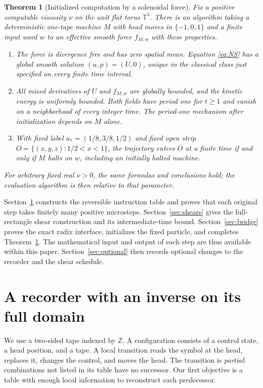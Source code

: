 \documentclass[11pt]{article}
\newtheorem{theorem}{Theorem}[section]
\theoremstyle{remark}
\newcommand{\T}{\mathbb T}
\begin{document}
\begin{theorem}[Initialized computation by a solenoidal force]\label{thm:initialized}
Fix a positive computable viscosity $\nu$ on the unit flat torus $\T^3$.
There is an algorithm taking a deterministic one-tape machine $M$ with head
moves in $\{-1,0,1\}$ and a finite input word $w$ to an effective smooth force
$f_{M,w}$ with these properties.
\begin{enumerate}[label=(\roman*),itemsep=2pt]
\item The force is divergence free and has zero spatial mean. Equation
\eqref{eq:NS} has a global smooth solution $(u,p)=(U,0)$, unique in the
classical class just specified on every finite time interval.
\item All mixed derivatives of $U$ and $f_{M,w}$ are globally bounded, and
the kinetic energy is uniformly bounded. Both fields have period one for
$t\ge1$ and vanish on a neighborhood of every integer time. The period-one
mechanism after initialization depends on $M$ alone.
\item With fixed label $a_*=(1/8,3/8,1/2)$ and fixed open strip
$O=\{(x,y,z):1/2<x<1\}$, the trajectory enters $O$ at a finite time if and
only if $M$ halts on $w$, including an initially halted machine.
\end{enumerate}
For arbitrary fixed real $\nu>0$, the same formulas and conclusions hold;
the evaluation algorithm is then relative to that parameter.
\end{theorem}

Section~\ref{sec:recorder} constructs the reversible instruction table and
proves that each original step takes finitely many positive microsteps.
Section~\ref{sec:shears} gives the full-rectangle shear construction and its
intermediate-time bound. Section~\ref{sec:bridge} proves the exact radix
interface, initializes the fixed particle, and completes
Theorem~\ref{thm:initialized}. The mathematical input and output of each
step are thus available within this paper. Section~\ref{sec:optional}
then records optional changes to the recorder and the shear schedule.

\section{A recorder with an inverse on its full domain}\label{sec:recorder}
We use a two-sided tape indexed by $\mathbb Z$. A configuration consists of a
control state, a head position, and a tape. A local transition reads the
symbol at the head, replaces it, changes the control, and moves the head.
The transition is \emph{partial}: combinations not listed in its table have no
successor. Our first objective is a table with enough local information to
reconstruct each predecessor.
\end{document}
